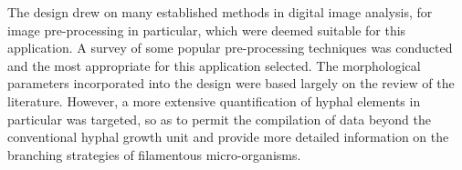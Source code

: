The design drew on many established methods in digital image analysis, for image pre-processing in particular, which were deemed suitable for this application. A survey of some popular pre-processing techniques was conducted and the most appropriate for this application selected. The morphological parameters incorporated into the design were based largely on the review of the literature. However, a more extensive quantification of hyphal elements in particular was targeted, so as to permit the compilation of data beyond the conventional hyphal growth unit and provide more detailed information on the branching strategies of filamentous micro-organisms.